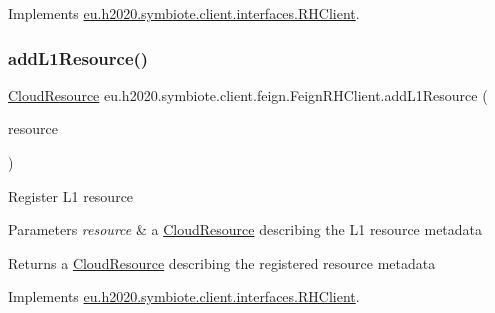 Implements \hyperlink{interfaceeu_1_1h2020_1_1symbiote_1_1client_1_1interfaces_1_1RHClient_a63d6d5525a8d7cc6b046dbd6229fddb4}{eu.\+h2020.\+symbiote.\+client.\+interfaces.\+R\+H\+Client}.

\mbox{\label{classeu_1_1h2020_1_1symbiote_1_1client_1_1feign_1_1FeignRHClient_a0e90096c4d28520a44ba0ea558027c54}} 
\subsubsection{\texorpdfstring{add\+L1\+Resource()}{addL1Resource()}}
{\footnotesize\ttfamily \hyperlink{classeu_1_1h2020_1_1symbiote_1_1cloud_1_1model_1_1internal_1_1CloudResource}{Cloud\+Resource} eu.\+h2020.\+symbiote.\+client.\+feign.\+Feign\+R\+H\+Client.\+add\+L1\+Resource (\begin{DoxyParamCaption}\item[{\hyperlink{classeu_1_1h2020_1_1symbiote_1_1cloud_1_1model_1_1internal_1_1CloudResource}{Cloud\+Resource}}]{resource }\end{DoxyParamCaption})}

Register L1 resource


\begin{DoxyParams}{Parameters}
{\em resource} & a \hyperlink{}{Cloud\+Resource} describing the L1 resource metadata \\
\hline
\end{DoxyParams}
\begin{DoxyReturn}{Returns}
a \hyperlink{}{Cloud\+Resource} describing the registered resource metadata 
\end{DoxyReturn}


Implements \hyperlink{interfaceeu_1_1h2020_1_1symbiote_1_1client_1_1interfaces_1_1RHClient_a7144c5a23f5e77e2fd10c2b79fcacf50}{eu.\+h2020.\+symbiote.\+client.\+interfaces.\+R\+H\+Client}.

\mbox{\label{classeu_1_1h2020_1_1symbiote_1_1client_1_1feign_1_1FeignRHClient_a4a6cb7cbfb9a41cf85a18c62cf257b69}} 
